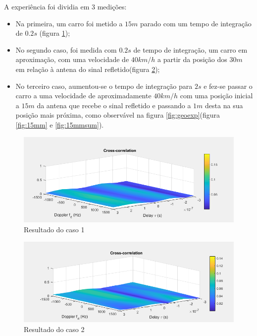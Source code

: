 A experiência foi dividia em 3 medições:
\begin{itemize}
\item Na primeira, um carro foi metido a $1 5m$ parado com um tempo de integração de $0.2 s$ (figura \ref{fig:15me});
\item No segundo caso, foi medida com $0.2 s$ de tempo de integração, um carro em aproximação, com uma velocidade de $40 km/h$  a partir da posição dos $30  m$ em relação à antena do sinal refletido(figura \ref{fig:20ma});
\item No terceiro caso, aumentou-se o tempo de integração para $2 s$ e fez-se passar o carro a uma velocidade de aproximadamente $40 km/h$ com uma posição inicial a $15m$ da antena que recebe o sinal refletido e passando a 
$1 m$ desta na sua posição mais próxima, como observável na figura \ref{fig:geoexp}(figura \ref{fig:15mm} e \ref{fig:15mmsum}). 
\end{itemize}

\begin{figure}[h]
\centering
\includegraphics[scale=0.5]{chapters/ch5/assets/15me}
\caption[Caso 1]{Resultado do caso 1}
\label{fig:15me}
\end{figure}

\begin{figure}[h]
\centering
\includegraphics[scale=0.5]{chapters/ch5/assets/20ma}
\caption[Caso 2]{Resultado do caso 2}
\label{fig:20ma}
\end{figure}

